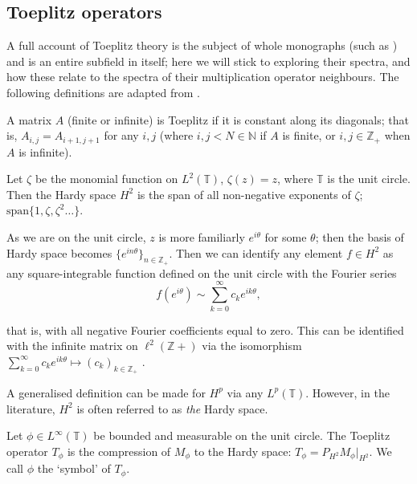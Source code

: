 \documentclass[../main.tex]{subfiles}
\begin{document}
\subsection{Toeplitz operators}\label{sec:toeplitz}

A full account of Toeplitz theory is the subject
of whole monographs (such as \parencite{bottcher1990analysis}) and is an entire
subfield in itself; here we will stick to exploring their spectra, and how these
relate to the spectra of their multiplication operator neighbours. The following
definitions are adapted from \parencite{arveson2002short}.

\begin{definition}
  A matrix $A$ (finite or infinite) is Toeplitz if it is constant along its
  diagonals; that is, $A_{i,j} = A_{i+1,j+1}$ for any $i, j$ (where $i,j <
  N \in \mathbb{N}$ if $A$ is finite, or $i,j \in \mathbb{Z}_+$ when $A$
  is infinite).
\end{definition}

\begin{definition}
  Let $\zeta$ be the monomial function on $L^2(\mathbb{T})$, $\zeta(z) = z$, where
  $\mathbb{T}$ is the unit circle. Then the Hardy space $H^2$ is the span
  of all non-negative exponents of $\zeta$; $\textrm{span}\{1, \zeta,
  \zeta^2 \hdots\}$.
\end{definition}

As we are on the unit circle, $z$ is more familiarly $e^{i \theta}$ for some
$\theta$; then the basis of Hardy space becomes $\{e^{i n \theta}\}_{n \in
\mathbb{Z}_+}$. Then we can identify any element $f \in H^2$ as any
square-integrable function defined on the unit circle with the Fourier series
$$f(e^{i \theta}) \sim \sum_{k=0}^\infty c_k e^{i k \theta},$$

that is, with all negative Fourier coefficients equal to zero. This can be
identified with the infinite matrix on $\ell^2(\mathbb{Z}+)$ via the isomorphism
$\sum_{k=0}^\infty c_k e^{i k \theta} \mapsto (c_k)_{k \in \mathbb{Z}_+}$
\parencite{bottcher1990analysis}.

A generalised definition can be made for $H^p$ via any $L^p(\mathbb{T})$.
However, in the literature, $H^2$ is often referred to as \emph{the}
Hardy space.

\begin{definition}
  Let $\phi \in L^{\infty}(\mathbb{T})$ be bounded and measurable on the unit
  circle. The Toeplitz operator $T_\phi$ is the compression of $M_\phi$ to
  the Hardy space: $T_{\phi} = P_{H^2} M_\phi \big|_{H^2}$. We call $\phi$
  the `symbol' of $T_\phi$.
\end{definition}
\end{document}

